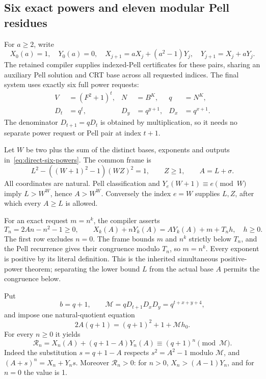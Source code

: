 \subsection{Six exact powers and eleven modular Pell residues}

For $a\ge2$, write
\[
 X_0(a)=1,\quad Y_0(a)=0,\quad
 X_{j+1}=aX_j+(a^2-1)Y_j,\quad Y_{j+1}=X_j+aY_j.
\]
The retained compiler supplies indexed-Pell certificates for these pairs,
sharing an auxiliary Pell solution and CRT base across all requested
indices. The final system uses exactly six full power requests:
\begin{equation}\label{eq:direct-six-powers}
 \begin{aligned}
 V&=(F^2+1)^t,& N&=B^K,&q&=N^K,\\
 D_t&=q^t,&D_y&=q^{y+1},&D_x&=q^{x+1}.
 \end{aligned}
\end{equation}
The denominator $D_{t+1}=qD_t$ is obtained by multiplication, so it needs
no separate power request or Pell pair at index $t+1$.

Let $W$ be two plus the sum of the distinct bases, exponents and outputs
in~\eqref{eq:direct-six-powers}. The common frame is
\begin{equation}\label{eq:direct-free-frame}
 L^2-((W+1)^2-1)(WZ)^2=1,\qquad Z\ge1,\qquad A=L+\sigma.
\end{equation}
All coordinates are natural. Pell classification and
$Y_e(W+1)\equiv e\pmod W$ imply $L>W^W$, hence $A>W^W$. Conversely the
index $e=W$ supplies $L,Z$, after which every $A\ge L$ is allowed.

For an exact request $m=n^k$, the compiler asserts
\[
 T_n=2An-n^2-1\ge0,\qquad
 X_k(A)+nY_k(A)=AY_k(A)+m+T_nh,\quad h\ge0.
\]
The first row excludes $n=0$. The frame bounds $m$ and $n^k$ strictly
below $T_n$, and the Pell recurrence gives their congruence modulo $T_n$,
so $m=n^k$. Every exponent is positive by its literal definition.
This is the inherited simultaneous positive-power theorem; separating
the lower bound $L$ from the actual base $A$ permits the congruence below.

Put
\begin{equation}\label{eq:direct-root-modulus}
 b=q+1,\qquad \mathcal M=qD_{t+1}D_xD_y
                           =q^{t+x+y+4},
\end{equation}
and impose one natural-quotient equation
\begin{equation}\label{eq:direct-common-root}
              2A(q+1)=(q+1)^2+1+\mathcal M h_0.
\end{equation}
For every $n\ge0$ it yields
\begin{equation}\label{eq:direct-residue}
 \mathcal R_n=X_n(A)+(q+1-A)Y_n(A)
                    \equiv(q+1)^n\pmod{\mathcal M}.
\end{equation}
Indeed the substitution $s=q+1-A$ respects $s^2=A^2-1$ modulo
$\mathcal M$, and $(A+s)^n=X_n+Y_ns$. Moreover $\mathcal R_n>0$:
for $n>0$, $X_n>(A-1)Y_n$, and for $n=0$ the value is 1.

